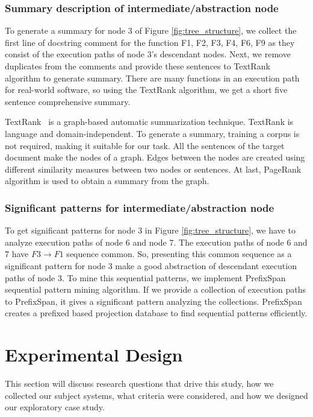 \subsubsection{Summary description of intermediate/abstraction node}
To generate a summary for node 3 of Figure \ref{fig:tree_structure}, we collect the first line of docstring comment for the function F1, F2, F3, F4, F6, F9 as they consist of the execution paths of node 3's descendant nodes. Next, we remove duplicates from the comments and provide these sentences to TextRank \cite{barrios2016variationsTextRankSummarization} algorithm to generate summary. There are many functions in an execution path for real-world software, so using the TextRank algorithm, we get a short five sentence comprehensive summary. 

TextRank~\cite{barrios2016variationsTextRankSummarization} is a graph-based automatic summarization technique. TextRank is language and domain-independent. To generate a summary, training a corpus is not required, making it suitable for our task. All the sentences of the target document make the nodes of a graph. Edges between the nodes are created using different similarity measures between two nodes or sentences. At last, PageRank~\cite{page1999pagerank} algorithm is used to obtain a summary from the graph.

\subsubsection{Significant patterns for intermediate/abstraction node}
To get significant patterns for node 3 in Figure \ref{fig:tree_structure}, we have to analyze execution paths of node 6 and node 7. The execution paths of node 6 and 7 have $ F3 \rightarrow  F1 $ sequence common. So, presenting this common sequence as a significant pattern for node 3 make a good abstraction of descendant execution paths of node 3. To mine this sequential patterns, we implement PrefixSpan \cite{han2001prefixspanSequentialPatterns} sequential pattern mining algorithm. If we provide a collection of execution paths to PrefixSpan, it gives a significant pattern analyzing the collections. PrefixSpan creates a prefixed based projection database to find sequential patterns efficiently.

\section{Experimental Design}
\label{evaluation}
This section will discuss research questions that drive this study, how we collected our subject systems, what criteria were considered, and how we designed our exploratory case study. 

